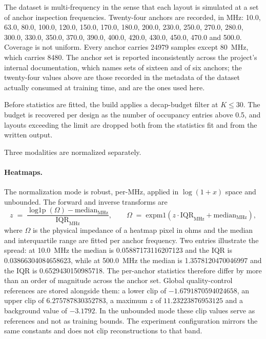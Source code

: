 The dataset is multi-frequency in the sense that each layout is simulated at a set of anchor
inspection frequencies. Twenty-four anchors are recorded, in MHz: 10.0, 63.0, 80.0, 100.0, 120.0,
150.0, 170.0, 180.0, 200.0, 230.0, 250.0, 270.0, 280.0, 300.0, 330.0, 350.0, 370.0, 390.0, 400.0,
420.0, 430.0, 450.0, 470.0 and 500.0. Coverage is not uniform. Every anchor carries 24979 samples
except 80~MHz, which carries 8480.
The anchor set is reported inconsistently across the project's internal documentation, which names
sets of sixteen and of six anchors; the twenty-four values above are those recorded in the metadata
of the dataset actually consumed at training time, and are the ones used here.

Before statistics are fitted, the build applies a decap-budget filter at $K \le 30$. The budget is
recovered per design as the number of occupancy entries above 0.5, and layouts exceeding the limit
are dropped both from the statistics fit and from the written output.

Three modalities are normalized separately.

\paragraph{Heatmaps.} The normalization mode is robust, per-MHz, applied in $\log(1+x)$ space and
unbounded. The forward and inverse transforms are
\begin{equation}
z \;=\; \frac{\operatorname{log1p}(\Omega) - \mathrm{median}_{\mathrm{MHz}}}{\mathrm{IQR}_{\mathrm{MHz}}},
\qquad
\Omega \;=\; \mathrm{expm1}\!\left(z \cdot \mathrm{IQR}_{\mathrm{MHz}} + \mathrm{median}_{\mathrm{MHz}}\right),
\label{eq:heatmap_norm}
\end{equation}
where $\Omega$ is the physical impedance of a heatmap pixel in ohms and the median and interquartile
range are fitted per anchor frequency. Two entries illustrate the spread: at 10.0~MHz the median is
0.05887173116207123 and the IQR is 0.03866304084658623, while at 500.0~MHz the median is
1.3578120470046997 and the IQR is 0.6529430150985718. The per-anchor statistics therefore differ by
more than an order of magnitude across the anchor set. Global quality-control references are stored
alongside them: a lower clip of $-1.6791870594024658$, an upper clip of $6.275787830352783$, a
maximum $z$ of $11.23223876953125$ and a background value of $-3.1792$. In the unbounded mode these
clip values serve as references and not as training bounds. The experiment configuration mirrors the
same constants and does not clip reconstructions to that band.

